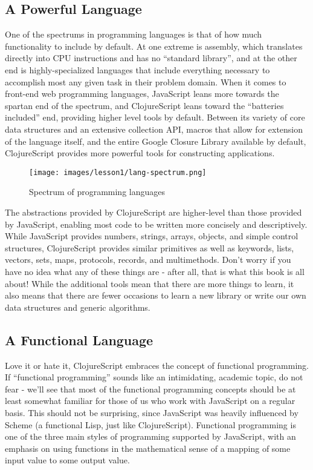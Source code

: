 \documentclass[10pt,twoside,openright]{memoir}
\begin{document}
\subsection{A Powerful Language}

One of the spectrums in programming languages is that of how much
functionality to include by default. At one extreme is assembly, which
translates directly into CPU instructions and has no ``standard
library'', and at the other end is highly-specialized languages that
include everything necessary to accomplish most any given task in their
problem domain. When it comes to front-end web programming languages,
JavaScript leans more towards the spartan end of the spectrum, and
ClojureScript leans toward the ``batteries included'' end, providing
higher level tools by default. Between its variety of core data
structures and an extensive collection API, macros that allow for
extension of the language itself, and the entire Google Closure Library
available by default, ClojureScript provides more powerful tools for
constructing applications.

\begin{figure}[H]
\caption{Spectrum of programming languages}
\centering
\texttt{[image: images/lesson1/lang-spectrum.png]}
\end{figure}

The abstractions provided by ClojureScript are higher-level than those
provided by JavaScript, enabling most code to be written more concisely
and descriptively. While JavaScript provides numbers, strings, arrays,
objects, and simple control structures, ClojureScript provides similar
primitives as well as keywords, lists, vectors, sets, maps, protocols,
records, and multimethods. Don't worry if you have no idea what any of
these things are - after all, that is what this book is all about! While
the additional tools mean that there are more things to learn, it also
means that there are fewer occasions to learn a new library or write our
own data structures and generic algorithms.

\subsection{A Functional Language}

Love it or hate it, ClojureScript embraces the concept of functional
programming. If ``functional programming'' sounds like an intimidating,
academic topic, do not fear - we'll see that most of the functional
programming concepts should be at least somewhat familiar for those of
us who work with JavaScript on a regular basis. This should not be
surprising, since JavaScript was heavily influenced by Scheme (a
functional Lisp, just like ClojureScript). Functional programming is one
of the three main styles of programming supported by JavaScript, with an
emphasis on using functions in the mathematical sense of a mapping of
some input value to some output value.
\end{document}
